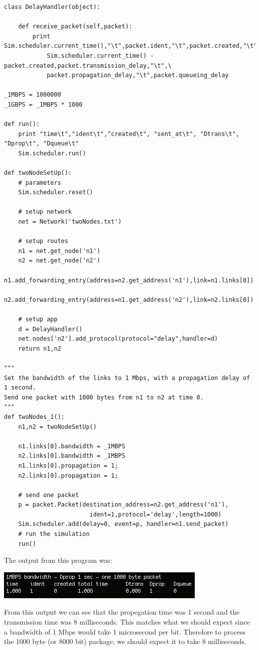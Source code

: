 \documentclass[11pt]{article}
\begin{document}
\begin{lstlisting}
class DelayHandler(object):

    def receive_packet(self,packet):
        print Sim.scheduler.current_time(),"\t",packet.ident,"\t",packet.created,"\t",\
            Sim.scheduler.current_time() - packet.created,packet.transmission_delay,"\t",\
            packet.propagation_delay,"\t",packet.queueing_delay

_1MBPS = 1000000
_1GBPS = _1MBPS * 1000

def run():
    print "time\t","ident\t","created\t", "sent_at\t", "Dtrans\t", "Dprop\t", "Dqueue\t"
    Sim.scheduler.run()

def twoNodeSetUp():
    # parameters
    Sim.scheduler.reset()

    # setup network
    net = Network('twoNodes.txt')

    # setup routes
    n1 = net.get_node('n1')
    n2 = net.get_node('n2')
    n1.add_forwarding_entry(address=n2.get_address('n1'),link=n1.links[0])
    n2.add_forwarding_entry(address=n1.get_address('n2'),link=n2.links[0])

    # setup app
    d = DelayHandler()
    net.nodes['n2'].add_protocol(protocol="delay",handler=d)
    return n1,n2

"""
Set the bandwidth of the links to 1 Mbps, with a propagation delay of 1 second. 
Send one packet with 1000 bytes from n1 to n2 at time 0.
"""
def twoNodes_1():
    n1,n2 = twoNodeSetUp()

    n1.links[0].bandwidth = _1MBPS
    n2.links[0].bandwidth = _1MBPS
    n1.links[0].propagation = 1;
    n2.links[0].propagation = 1;

    # send one packet
    p = packet.Packet(destination_address=n2.get_address('n1'),
                        ident=1,protocol='delay',length=1000)
    Sim.scheduler.add(delay=0, event=p, handler=n1.send_packet)
    # run the simulation
    run()
\end{lstlisting}

The output from this program was:

\includegraphics{twoNode-1.png}

From this output we can see that the propegation time was 1 second and the transmission time was 8 milliseconds. This matches what we should expect since a bandwidth of 1 Mbps would take 1 microsecond per bit. Therefore to process the 1000 byte (or 8000 bit) package, we should expect it to take 8 milliseconds.
\end{document}
